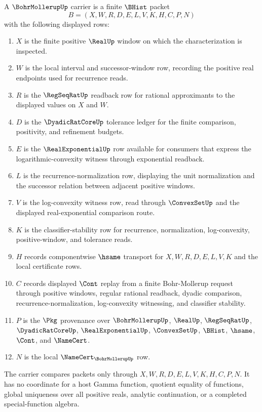 \begin{definition}
\label{def:bohr-mollerup-carrier}
A $\BohrMollerupUp$ carrier is a finite $\BHist$ packet
$$
B=(X,W,R,D,E,L,V,K,H,C,P,N)
$$
with the following displayed rows:
\begin{enumerate}
\item $X$ is the finite positive $\RealUp$ window on which the characterization is inspected.
\item $W$ is the local interval and successor-window row, recording the positive real endpoints used for recurrence reads.
\item $R$ is the $\RegSeqRatUp$ readback row for rational approximants to the displayed values on $X$ and $W$.
\item $D$ is the $\DyadicRatCoreUp$ tolerance ledger for the finite comparison, positivity, and refinement budgets.
\item $E$ is the $\RealExponentialUp$ row available for consumers that express the logarithmic-convexity witness through exponential readback.
\item $L$ is the recurrence-normalization row, displaying the unit normalization and the successor relation between adjacent positive windows.
\item $V$ is the log-convexity witness row, read through $\ConvexSetUp$ and the displayed real-exponential comparison route.
\item $K$ is the classifier-stability row for recurrence, normalization, log-convexity, positive-window, and tolerance reads.
\item $H$ records componentwise $\hsame$ transport for $X,W,R,D,E,L,V,K$ and the local certificate rows.
\item $C$ records displayed $\Cont$ replay from a finite Bohr-Mollerup request through positive windows, regular rational readback, dyadic comparison, recurrence-normalization, log-convexity witnessing, and classifier stability.
\item $P$ is the $\Pkg$ provenance over $\BohrMollerupUp$, $\RealUp$, $\RegSeqRatUp$, $\DyadicRatCoreUp$, $\RealExponentialUp$, $\ConvexSetUp$, $\BHist$, $\hsame$, $\Cont$, and $\NameCert$.
\item $N$ is the local $\NameCert_{\BohrMollerupUp}$ row.
\end{enumerate}
The carrier compares packets only through $X,W,R,D,E,L,V,K,H,C,P,N$. It has no coordinate for a host Gamma function, quotient equality of functions, global uniqueness over all positive reals, analytic continuation, or a completed special-function algebra.
\end{definition}

